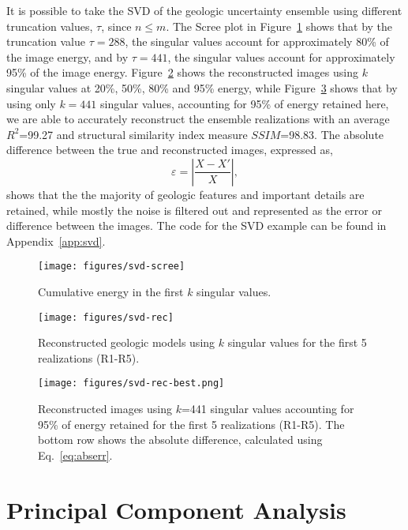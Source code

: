 \documentclass[a4paper,fleqn,12pt]{article}
\begin{document}
It is possible to take the SVD of the geologic uncertainty ensemble using different truncation values, $\tau$, since $n\leq m$. The Scree plot in Figure~\ref{fig:svd-scree} shows that by the truncation value $\tau=288$, the singular values account for approximately 80\% of the image energy, and by $\tau=441$, the singular values account for approximately 95\% of the image energy. Figure~\ref{fig:svd-rec} shows the reconstructed images using $k$ singular values at 20\%, 50\%, 80\% and 95\% energy, while Figure~\ref{fig:svd-rec-best} shows that by using only $k=441$ singular values, accounting for 95\% of energy retained here, we are able to accurately reconstruct the ensemble realizations with an average $R^2$=99.27 and structural similarity index measure $SSIM$=98.83. The absolute difference between the true and reconstructed images, expressed as,
\begin{equation}\label{eq:abserr}
    \varepsilon = |\frac{X-X'}{X}| ,
\end{equation}
shows that the the majority of geologic features and important details are retained, while mostly the noise is filtered out and represented as the error or difference between the images. The code for the SVD example can be found in Appendix~\ref{app:svd}.

\begin{figure}[H]
    \centering
    \texttt{[image: figures/svd-scree]}
    \caption{Cumulative energy in the first $k$ singular values.}
    \label{fig:svd-scree}
\end{figure}

\begin{figure}[H]
    \centering
    \texttt{[image: figures/svd-rec]}
    \caption{Reconstructed geologic models using $k$ singular values for the first 5 realizations (R1-R5).}
    \label{fig:svd-rec}
\end{figure}

\begin{figure}[H]
    \centering
    \texttt{[image: figures/svd-rec-best.png]}
    \caption{Reconstructed images using $k$=441 singular values accounting for 95\% of energy retained for the first 5 realizations (R1-R5). The bottom row shows the absolute difference, calculated using Eq.~\ref{eq:abserr}.}
    \label{fig:svd-rec-best}
\end{figure}

\pagebreak
\section*{Principal Component Analysis}
\end{document}

